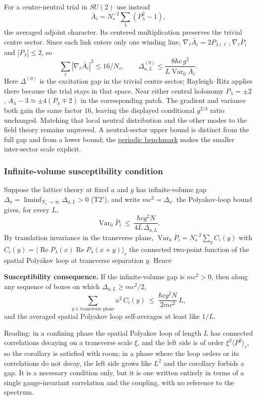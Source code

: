 \documentclass[11pt,a4paper]{article}
\begin{document}
For a centre-neutral trial in \(SU(2)\) use instead
\[\bar A_i=N_s^{-2}\sum_\lambda(P_\lambda^2-1),\] the averaged adjoint
character. Its centered multiplication preserves the trivial centre
sector. Since each link enters only one winding line,
\(\nabla_\ell\bar A_i=2P_{\lambda(\ell)}\nabla_\ell\bar P_i\) and
\(|P_\lambda|\le2\), so
\[\sum_\ell|\nabla_\ell\bar A_i|^2\le16/N_s,\qquad
\Delta^{(0)}_{a,L}\le\frac{8\hbar c\,g^2}
{L\operatorname{Var}_0\bar A_i}.\] Here \(\Delta^{(0)}\) is the
excitation gap in the trivial centre sector; Rayleigh--Ritz applies
there because the trial stays in that space. Near either central
holonomy \(P_\lambda=\pm2\), \(A_\lambda-3\simeq\pm4(P_\lambda\mp2)\) in
the corresponding patch. The gradient and variance both gain the same
factor \(16\), leaving the displayed conditional \(g^{2/3}\) ratio
unchanged. Matching that local neutral distribution and the other modes
to the field theory remains unproved. A neutral-sector upper bound is
distinct from the full gap and from a lower bound; the
\href{torus-valley-potential.md\#a-centre-odd-variational-countertest}{periodic
benchmark} makes the smaller inter-sector scale explicit.

\hypertarget{infinite-volume-susceptibility-condition}{%
\subsubsection{Infinite-volume susceptibility
condition}\label{infinite-volume-susceptibility-condition}}

Suppose the lattice theory at fixed \(a\) and \(g\) has infinite-volume
gap \(\Delta_a=\liminf_{N_s\to\infty}\Delta_{a,L}>0\) (T2\('\)), and
write \(mc^2=\Delta_a\). the Polyakov-loop bound gives, for every \(L\),
\[\operatorname{Var}_0\bar P_i\ \le\ \frac{\hbar cg^2N}{4L\,\Delta_{a,L}} .\]
By translation invariance in the transverse plane,
\(\operatorname{Var}_0\bar P_i=N_s^{-2}\sum_{y}C_i(y)\) with
\(C_i(y)=\langle\operatorname{Re}P_\lambda(x)\operatorname{Re}P_\lambda(x+y)\rangle_c\)
the connected two-point function of the spatial Polyakov loop at
transverse separation \(y\). Hence

\textbf{Susceptibility consequence.} If the infinite-volume gap is
\(mc^2>0\), then along any sequence of boxes on which
\(\Delta_{a,L}\ge mc^2/2\),
\[\sum_{y\in\text{transverse plane}}a^2\,C_i(y)\ \le\ \frac{\hbar cg^2N}{2mc^2}\,L ,\]
and the averaged spatial Polyakov loop self-averages at least like
\(1/L\).

Reading: in a confining phase the spatial Polyakov loop of length \(L\)
has connected correlations decaying on a transverse scale \(\xi\), and
the left side is of order \(\xi^2\langle P^2\rangle_c\), so the
corollary is satisfied with room; in a phase where the loop orders or
its correlations do not decay, the left side grows like \(L^2\) and the
corollary forbids a gap. It is a necessary condition only, but it is one
written entirely in terms of a single gauge-invariant correlation and
the coupling, with no reference to the spectrum.
\end{document}
